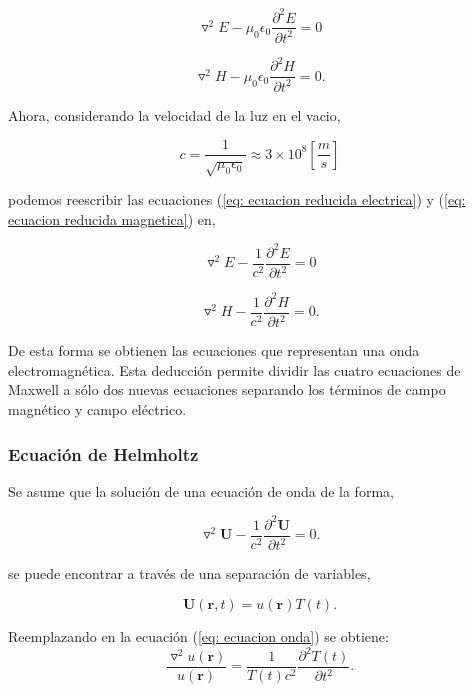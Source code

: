\documentclass[12pt,letterpaper]{article}
\numberwithin{equation}{section}
\begin{document}
\begin{equation}
	\triangledown^2E - \mu_0\epsilon_0\frac{\partial^2E}{\partial t^2}= 0
	\label{eq: ecuacion reducida electrica}
\end{equation}

\begin{equation}
\triangledown^2H - \mu_0\epsilon_0\frac{\partial^2H}{\partial t^2}= 0.
\label{eq: ecuacion reducida magnetica}
\end{equation}

Ahora, considerando la velocidad de la luz en el vacio,

$$c = \frac{1}{\sqrt{\mu_0\epsilon_0}} \approx 3\times10^8\left[\frac{m}{s}\right]$$

podemos reescribir las ecuaciones (\ref{eq: ecuacion reducida electrica}) y (\ref{eq: ecuacion reducida magnetica}) en,

\begin{equation}
\triangledown^2E - \frac{1}{c^2}\frac{\partial^2E}{\partial t^2}= 0
\label{eq: ecuacion onda electrica}
\end{equation}

\begin{equation}
\triangledown^2H - \frac{1}{c^2}\frac{\partial^2H}{\partial t^2}= 0.
\label{eq: ecuacion onda magnetica}
\end{equation}
  
De esta forma se obtienen las ecuaciones que representan una onda electromagnética. Esta deducción permite dividir las cuatro ecuaciones de Maxwell a sólo dos nuevas ecuaciones separando los términos de campo magnético y campo eléctrico. 

\subsubsection{Ecuación de Helmholtz}
Se asume que la solución de una ecuación de onda de la forma,

\begin{equation}
\triangledown^2\textbf{U} - \frac{1}{c^2}\frac{\partial^2\textbf{U}}{\partial t^2}= 0.
\label{eq: ecuacion onda}
\end{equation} 
 
se puede encontrar a través de una separación de variables,

$$\textbf{U}(\textbf{r},t)=u(\textbf{r})T(t).$$

Reemplazando en la ecuación (\ref{eq: ecuacion onda}) se obtiene:
\begin{equation}
	\frac{\triangledown^2u(\textbf{r})}{u(\textbf{r})} = \frac{1}{T(t)c^2}\frac{\partial^2T(t)}{\partial t^2}.
	\label{eq: antes Helmholtz}
\end{equation}
\end{document}
